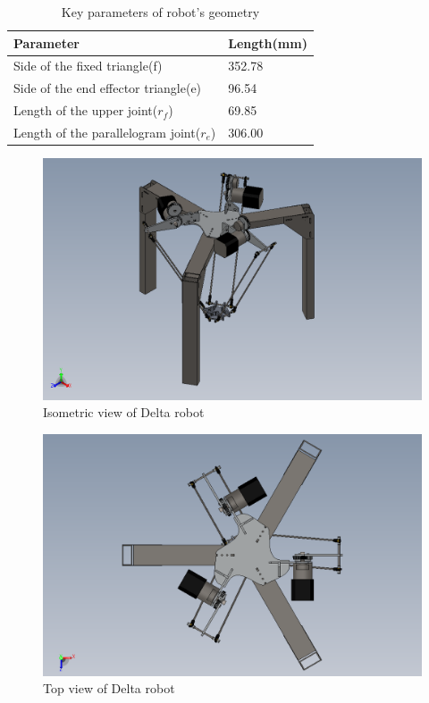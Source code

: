 \begin{table}[H]
	\centering
	\caption{Key parameters of robot's geometry}	
	\label{tab:arduinomega2560_technical_specs}
	\begin{tabularx}{0.65\textwidth}{ll}
		\toprule
		\textbf{Parameter} & \textbf{Length(mm)} 		\\
		\midrule
		Side of the fixed triangle(f) & 352.78 			\\
		\midrule
		Side of the end effector triangle(e) & 96.54 	\\
		\midrule
		Length of the upper joint($r_{f}$) & 69.85 		\\
		\midrule
		Length of the parallelogram joint($r_{e}$) & 306.00 \\
		\bottomrule
	\end{tabularx}
\end{table}
\begin{figure}[H]
	\centering
	\includegraphics[width=\maxwidth{15cm}, keepaspectratio]{Chapters/Fig/robot_isometric_view.png}
	\caption{Isometric view of Delta robot}
	\label{fig:robot_isometric_view}
\end{figure}

\begin{figure}[H]
	\centering
	\includegraphics[width=\maxwidth{15cm}, keepaspectratio]{Chapters/Fig/robot_top_view.png}
	\caption{Top view of Delta robot}
	\label{fig:robot_top_view}
\end{figure}

